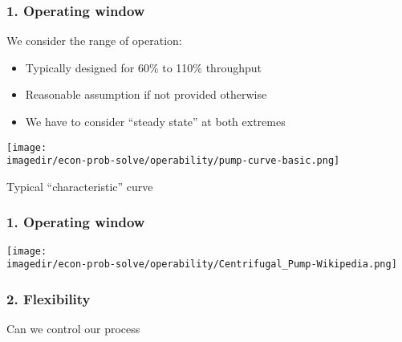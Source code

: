 \begin{frame}\frametitle{1. Operating window}
	We consider the range of operation:
	\begin{itemize}
		\item	Typically designed for 60\% to 110\% throughput
		\item	Reasonable assumption if not provided otherwise
		\item	We have to consider ``steady state'' at both extremes
	\end{itemize}
	\begin{center}
		\texttt{[image: \\imagedir/econ-prob-solve/operability/pump-curve-basic.png]}
	\end{center}
	\vspace{-12pt}
	Typical ``characteristic'' curve
\end{frame}

\begin{frame}\frametitle{1. Operating window}
	\begin{center}
		\texttt{[image: \\imagedir/econ-prob-solve/operability/Centrifugal\_Pump-Wikipedia.png]}
	\end{center}
	\vspace{-1.7cm}
\end{frame}

\begin{frame}\frametitle{2. Flexibility}
	Can we control our process 
\end{frame}
